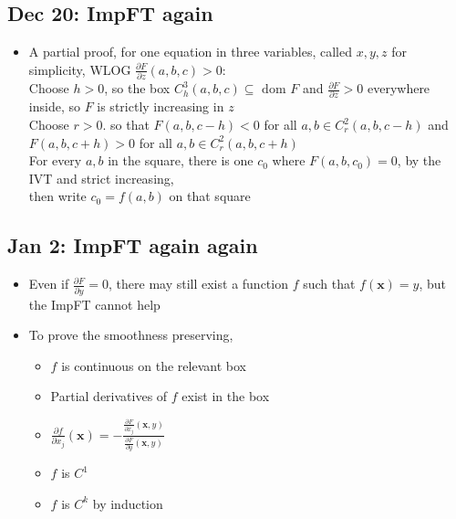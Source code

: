\documentclass[10pt, oneside]{article}
\newcommand{\del}{\partial}
\renewcommand{\vec}[1]{\mathbf{#1}}
\begin{document}
\subsection{Dec 20: ImpFT again}
\begin{itemize}
    \item A partial proof, for one equation in three variables, called $x,y,z$ for simplicity, WLOG $\frac{\del F}{\del z} (a,b,c) > 0$:\\
        Choose $h > 0$, so the box $C_h^3(a,b,c) \subseteq \text{ dom } F$ and $\frac{\del F}{\del z} > 0$ everywhere inside, so $F$ is strictly increasing in $z$\\
        Choose $r > 0$. so that $F(a,b,c-h) < 0$ for all $a,b \in C_r^2(a,b,c - h)$ and $F(a,b,c+h) > 0$ for all $a,b \in C_r^2(a,b,c + h)$\\
        For every $a,b$ in the square, there is one $c_0$ where $F(a,b,c_0) = 0$, by the IVT and strict increasing,\\
        then write $c_0 = f(a,b)$ on that square
\end{itemize}

\subsection{Jan 2: ImpFT again again}
\begin{itemize}
    \item Even if $\frac{\del F}{\del y} = 0$, there may still exist a function $f$ such that $f(\vec{x}) = y$, but the ImpFT cannot help
    \item To prove the smoothness preserving,
        \begin{itemize}
            \item $f$ is continuous on the relevant box
            \item Partial derivatives of $f$ exist in the box
            \item $\frac{\del f}{\del x_j} (\vec{x}) = -\frac{\frac{\del F}{\del x_j} (\vec{x},y)}{\frac{\del F}{\del y}(\vec{x},y)}$
            \item $f$ is $C^1$
            \item $f$ is $C^k$ by induction
        \end{itemize}
\end{itemize}
\end{document}
